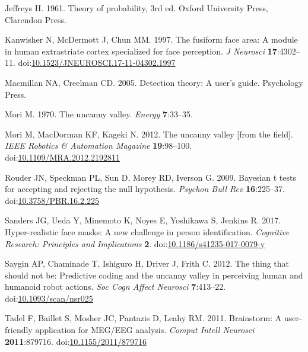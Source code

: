 \documentclass[
]{article}
\newlength{\cslhangindent}
\newlength{\cslentryspacingunit} %
\newenvironment{CSLReferences}[2] %
 {%
  \setlength{\parindent}{0pt}
  \ifodd #1
  \let\oldpar\par
  \def\par{\hangindent=\cslhangindent\oldpar}
  \fi
  \setlength{\parskip}{#2\cslentryspacingunit}
 }%
 {}
\begin{document}
\begin{CSLReferences}{1}{0}
\leavevmode{}%
Jeffreys H. 1961. Theory of probability, 3rd ed. Oxford University Press, Clarendon Press.

\leavevmode{}%
Kanwisher N, McDermott J, Chun MM. 1997. The fusiform face area: A module in human extrastriate cortex specialized for face perception. \emph{J Neurosci} \textbf{17}:4302--11. doi:\href{https://doi.org/10.1523/JNEUROSCI.17-11-04302.1997}{10.1523/JNEUROSCI.17-11-04302.1997}

\leavevmode{}%
Macmillan NA, Creelman CD. 2005. Detection theory: A user's guide. Psychology Press.

\leavevmode{}%
Mori M. 1970. The uncanny valley. \emph{Energy} \textbf{7}:33--35.

\leavevmode{}%
Mori M, MacDorman KF, Kageki N. 2012. The uncanny valley {[}from the field{]}. \emph{IEEE Robotics \& Automation Magazine} \textbf{19}:98--100. doi:\href{https://doi.org/10.1109/MRA.2012.2192811}{10.1109/MRA.2012.2192811}

\leavevmode{}%
Rouder JN, Speckman PL, Sun D, Morey RD, Iverson G. 2009. Bayesian t tests for accepting and rejecting the null hypothesis. \emph{Psychon Bull Rev} \textbf{16}:225--37. doi:\href{https://doi.org/10.3758/PBR.16.2.225}{10.3758/PBR.16.2.225}

\leavevmode{}%
Sanders JG, Ueda Y, Minemoto K, Noyes E, Yoshikawa S, Jenkins R. 2017. Hyper-realistic face masks: A new challenge in person identification. \emph{Cognitive Research: Principles and Implications} \textbf{2}. doi:\href{https://doi.org/10.1186/s41235-017-0079-y}{10.1186/s41235-017-0079-y}

\leavevmode{}%
Saygin AP, Chaminade T, Ishiguro H, Driver J, Frith C. 2012. The thing that should not be: Predictive coding and the uncanny valley in perceiving human and humanoid robot actions. \emph{Soc Cogn Affect Neurosci} \textbf{7}:413--22. doi:\href{https://doi.org/10.1093/scan/nsr025}{10.1093/scan/nsr025}

\leavevmode{}%
Tadel F, Baillet S, Mosher JC, Pantazis D, Leahy RM. 2011. Brainstorm: A user-friendly application for MEG/EEG analysis. \emph{Comput Intell Neurosci} \textbf{2011}:879716. doi:\href{https://doi.org/10.1155/2011/879716}{10.1155/2011/879716}


\end{CSLReferences}
\end{document}
